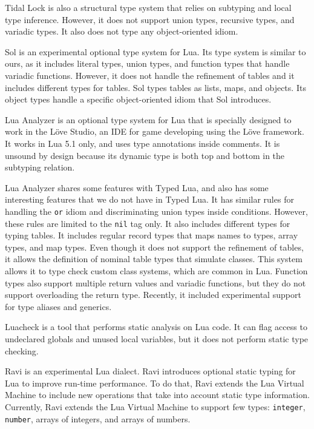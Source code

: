 Tidal Lock is also a structural type system that relies on subtyping and
local type inference.
However, it does not support union types, recursive types, and variadic types.
It also does not type any object-oriented idiom.

Sol \cite{sol} is an experimental optional type system for Lua.
Its type system is similar to ours, as it includes literal types,
union types, and function types that handle variadic functions.
However, it does not handle the refinement of tables and it
includes different types for tables.
Sol types tables as lists, maps, and objects.
Its object types handle a specific object-oriented idiom that
Sol introduces.

Lua Analyzer \cite{luaanalyzer} is an optional type system for Lua
that is specially designed to work in the Löve Studio,
an IDE for game developing using the Löve framework.
It works in Lua 5.1 only, and uses type annotations inside comments.
It is unsound by design because its dynamic type is both
top and bottom in the subtyping relation.

Lua Analyzer shares some features with Typed Lua, and also
has some interesting features that we do not have in Typed Lua.
It has similar rules for handling the \texttt{or} idiom and
discriminating union types inside conditions.
However, these rules are limited to the \texttt{nil} tag only.
It also includes different types for typing tables.
It includes regular record types that maps names to types,
array types, and map types.
Even though it does not support the refinement of tables,
it allows the definition of nominal table types that simulate classes.
This system allows it to type check custom class systems,
which are common in Lua.
Function types also support multiple return values and
variadic functions, but they do not support overloading the
return type.
Recently, it included experimental support for type aliases and generics.

Luacheck \cite{luacheck} is a tool that performs static analysis on Lua code.
It can flag access to undeclared globals and unused local variables,
but it does not perform static type checking.

Ravi \cite{ravi} is an experimental Lua dialect.
Ravi introduces optional static typing for Lua to improve run-time performance.
To do that, Ravi extends the Lua Virtual Machine to include new
operations that take into account static type information.
Currently, Ravi extends the Lua Virtual Machine to support few types:
\texttt{integer}, \texttt{number}, arrays of integers, and arrays of numbers.

